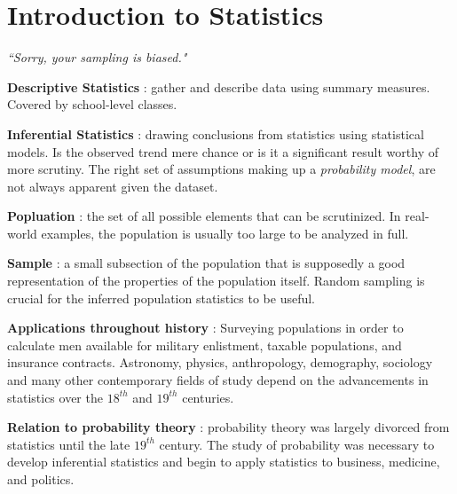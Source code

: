 \chapter{Introduction to Statistics}

\begin{flushright}
	\textit{``Sorry, your sampling is biased."} 
\end{flushright}

\textbf{Descriptive Statistics} : gather and describe data using summary measures. Covered by school-level classes.

\textbf{Inferential Statistics} : drawing conclusions from statistics using statistical models. Is the observed trend mere chance or is it a significant result worthy of more scrutiny. The right set of assumptions making up a \textit{probability model}, are not always apparent given the dataset.

\textbf{Popluation} : the set of all possible elements that can be scrutinized. In real-world examples, the population is usually too large to be analyzed in full.

\textbf{Sample} : a small subsection of the population that is supposedly a good representation of the properties of the population itself. Random sampling is crucial for the inferred population statistics to be useful.

\textbf{Applications throughout history} : Surveying populations in order to calculate men available for military enlistment, taxable populations, and insurance contracts. Astronomy, physics, anthropology, demography, sociology and many other contemporary fields of study depend on the advancements in statistics over the $ 18^{th} $ and $19^{th}$ centuries.

\textbf{Relation to probability theory} : probability theory was largely divorced from statistics until the late $ 19^{th} $ century. The study of probability was necessary to develop inferential statistics and begin to apply statistics to business, medicine, and politics.

\newpage

